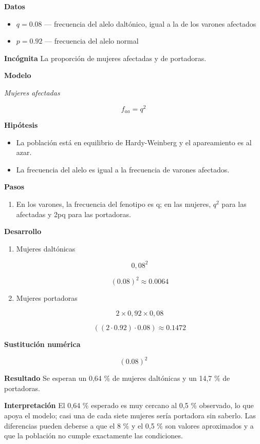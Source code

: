 \documentclass{book}
\begin{document}
\noindent\textbf{Datos}
\begin{itemize}
\item $q = 0.08$ — frecuencia del alelo daltónico, igual a la de los varones afectados
\item $p = 0.92$ — frecuencia del alelo normal
\end{itemize}

\noindent\textbf{Incógnita}
La proporción de mujeres afectadas y de portadoras.


\noindent\textbf{Modelo}

\noindent\textit{Mujeres afectadas}

\[
f_{aa} = q^{2}
\]

\noindent\textbf{Hipótesis}
\begin{itemize}
\item La población está en equilibrio de Hardy-Weinberg y el apareamiento es al azar.
\item La frecuencia del alelo es igual a la frecuencia de varones afectados.
\end{itemize}

\noindent\textbf{Pasos}
\begin{enumerate}
\item
En los varones, la frecuencia del fenotipo es q; en las mujeres, \(q^{2}\) para las afectadas y 2pq para las portadoras.

\end{enumerate}

\noindent\textbf{Desarrollo}
\begin{enumerate}
\item
Mujeres daltónicas


\[
0{,}08^2
\]

\[
\left(0.08\right)^{2} \approx 0.0064
\]
\item
Mujeres portadoras


\[
2 \times 0{,}92 \times 0{,}08
\]

\[
\left(\left(2\cdot 0.92\right)\cdot 0.08\right) \approx 0.1472
\]
\end{enumerate}

\noindent\textbf{Sustitución numérica}

\[
\left(0.08\right)^{2}
\]

\noindent\textbf{Resultado}
Se esperan un 0,64 \% de mujeres daltónicas y un 14,7 \% de portadoras.


\noindent\textbf{Interpretación}
El 0,64 \% esperado es muy cercano al 0,5 \% observado, lo que apoya el modelo; casi una de cada siete mujeres sería portadora sin saberlo. Las diferencias pueden deberse a que el 8 \% y el 0,5 \% son valores aproximados y a que la población no cumple exactamente las condiciones.
\end{document}
